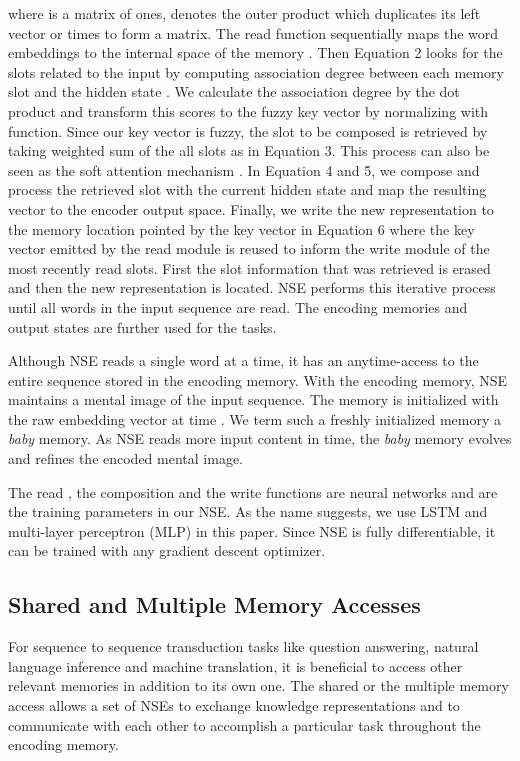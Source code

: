 \documentclass{article}
\begin{document}
where  is a matrix of ones,  denotes the outer product which duplicates its left vector  or  times to form a matrix. The read function  sequentially maps the word embeddings to the internal space of the memory . Then Equation 2 looks for the slots related to the input by computing association degree between each memory slot and the hidden state . We calculate the association degree by the dot product and transform this scores to the fuzzy key vector  by normalizing with  function. Since our key vector is fuzzy, the slot to be composed is retrieved by taking weighted sum of the all slots as in Equation 3. This process can also be seen as the soft attention mechanism \cite{bahdanau:15}. In Equation 4 and 5, we compose and process the retrieved slot with the current hidden state and map the resulting vector to the encoder output space. Finally, we write the new representation to the memory location pointed by the key vector in Equation 6 where the key vector  emitted by the read module is reused to inform the write module of the most recently read slots. First the slot information that was retrieved is erased and then the new representation is located. NSE performs this iterative process until all words in the input sequence are read. The encoding memories  and output states  are further used for the tasks.

Although NSE reads a single word at a time, it has an anytime-access to the entire sequence stored in the encoding memory. With the encoding memory, NSE maintains a mental image of the input sequence. The memory is initialized with the raw embedding vector at time . We term such a freshly initialized memory a \textit{baby} memory. As NSE reads more input content in time, the \textit{baby} memory evolves and refines the encoded mental image. 

The read , the composition  and the write  functions are neural networks and are the training parameters in our NSE. As the name suggests, we use LSTM and multi-layer perceptron (MLP) in this paper. Since NSE is fully differentiable, it can be trained with any gradient descent optimizer.  

\subsection{Shared and Multiple Memory Accesses}

For sequence to sequence transduction tasks like question answering, natural language inference and machine translation, it is beneficial to access other relevant memories in addition to its own one. The shared or the multiple memory access allows a set of NSEs to exchange knowledge representations and to communicate with each other to accomplish a particular task throughout the encoding memory. 
\end{document}
